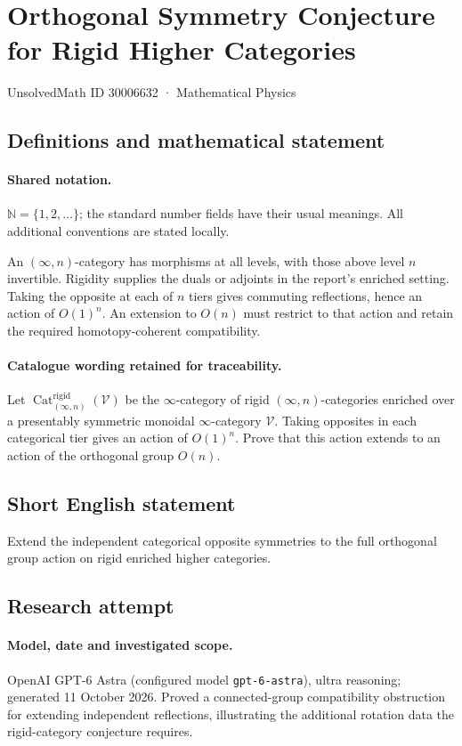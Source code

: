 \documentclass[11pt]{article}
\begin{document}
\setcounter{section}{30006631}
\section{Orthogonal Symmetry Conjecture for Rigid Higher Categories}\label{30006632}
{\small UnsolvedMath ID 30006632 · Mathematical Physics}
\subsection{Definitions and mathematical statement}

\paragraph{Shared notation.}$\mathbb N=\{1,2,\ldots\}$; the standard number fields have their usual meanings. All additional conventions are stated locally.


An $(\infty,n)$-category has morphisms at all levels, with those above level $n$ invertible. Rigidity supplies the duals or adjoints in the report's enriched setting. Taking the opposite at each of $n$ tiers gives commuting reflections, hence an action of $O(1)^n$. An extension to $O(n)$ must restrict to that action and retain the required homotopy-coherent compatibility.

\paragraph{Catalogue wording retained for traceability.}
Let $\operatorname{Cat}^{\mathrm{rigid}}_{(\infty,n)}(\mathcal{V})$ be the $\infty$-category of rigid $(\infty,n)$-categories enriched over a presentably symmetric monoidal $\infty$-category $\mathcal{V}$. Taking opposites in each categorical tier gives an action of $O(1)^n$. Prove that this action extends to an action of the orthogonal group $O(n)$.
\subsection{Short English statement}
Extend the independent categorical opposite symmetries to the full orthogonal group action on rigid enriched higher categories.
\subsection{Research attempt}
\paragraph{Model, date and investigated scope.}
OpenAI GPT-6 Astra (configured model \texttt{gpt-6-astra}), ultra reasoning; generated 11 October 2026. Proved a connected-group compatibility obstruction for extending independent reflections, illustrating the additional rotation data the rigid-category conjecture requires.
\end{document}
